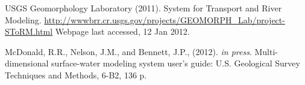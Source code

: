 \documentclass[12pt]{article}
\begin{document}
\begin{thebibliography}{}

{USGS Geomorphology Laboratory} (2011).
\newblock System for Transport and River Modeling.   
\url{http://wwwbrr.cr.usgs.gov/projects/GEOMORPH_Lab/project-SToRM.html} Webpage last accessed, 12 Jan 2012.

{McDonald, R.R., Nelson, J.M., and Bennett, J.P.}, (2012).  
\textsl{in press}. Multi-dimensional surface-water modeling system user's guide: U.S. Geological Survey Techniques and Methods, 6-B2, 136 p.



\end{thebibliography}
\end{document}
